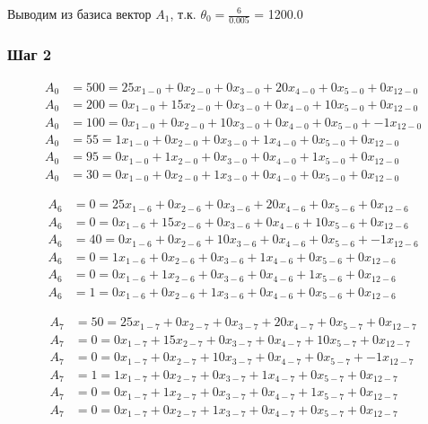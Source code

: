 Выводим из базиса вектор $A_1$, т.к. $\theta_0 = \frac{6}{0.005}$ = 1200.0

\subsubsection{Шаг 2}

\small

\vspace{-\baselineskip}\begin{align*}
	A_{0} &= 500 = 25x_{1-0} + 0x_{2-0} + 0x_{3-0} + 20x_{4-0} + 0x_{5-0} + 0x_{12-0} \\ 
	A_{0} &= 200 = 0x_{1-0} + 15x_{2-0} + 0x_{3-0} + 0x_{4-0} + 10x_{5-0} + 0x_{12-0} \\ 
	A_{0} &= 100 = 0x_{1-0} + 0x_{2-0} + 10x_{3-0} + 0x_{4-0} + 0x_{5-0} + -1x_{12-0} \\ 
	A_{0} &= 55 = 1x_{1-0} + 0x_{2-0} + 0x_{3-0} + 1x_{4-0} + 0x_{5-0} + 0x_{12-0} \\ 
	A_{0} &= 95 = 0x_{1-0} + 1x_{2-0} + 0x_{3-0} + 0x_{4-0} + 1x_{5-0} + 0x_{12-0} \\ 
	A_{0} &= 30 = 0x_{1-0} + 0x_{2-0} + 1x_{3-0} + 0x_{4-0} + 0x_{5-0} + 0x_{12-0}
\end{align*}

\vspace{-\baselineskip}\begin{align*}
	A_{6} &= 0 = 25x_{1-6} + 0x_{2-6} + 0x_{3-6} + 20x_{4-6} + 0x_{5-6} + 0x_{12-6} \\ 
	A_{6} &= 0 = 0x_{1-6} + 15x_{2-6} + 0x_{3-6} + 0x_{4-6} + 10x_{5-6} + 0x_{12-6} \\ 
	A_{6} &= 40 = 0x_{1-6} + 0x_{2-6} + 10x_{3-6} + 0x_{4-6} + 0x_{5-6} + -1x_{12-6} \\ 
	A_{6} &= 0 = 1x_{1-6} + 0x_{2-6} + 0x_{3-6} + 1x_{4-6} + 0x_{5-6} + 0x_{12-6} \\ 
	A_{6} &= 0 = 0x_{1-6} + 1x_{2-6} + 0x_{3-6} + 0x_{4-6} + 1x_{5-6} + 0x_{12-6} \\ 
	A_{6} &= 1 = 0x_{1-6} + 0x_{2-6} + 1x_{3-6} + 0x_{4-6} + 0x_{5-6} + 0x_{12-6}
\end{align*}

\vspace{-\baselineskip}\begin{align*}
	A_{7} &= 50 = 25x_{1-7} + 0x_{2-7} + 0x_{3-7} + 20x_{4-7} + 0x_{5-7} + 0x_{12-7} \\ 
	A_{7} &= 0 = 0x_{1-7} + 15x_{2-7} + 0x_{3-7} + 0x_{4-7} + 10x_{5-7} + 0x_{12-7} \\ 
	A_{7} &= 0 = 0x_{1-7} + 0x_{2-7} + 10x_{3-7} + 0x_{4-7} + 0x_{5-7} + -1x_{12-7} \\ 
	A_{7} &= 1 = 1x_{1-7} + 0x_{2-7} + 0x_{3-7} + 1x_{4-7} + 0x_{5-7} + 0x_{12-7} \\ 
	A_{7} &= 0 = 0x_{1-7} + 1x_{2-7} + 0x_{3-7} + 0x_{4-7} + 1x_{5-7} + 0x_{12-7} \\ 
	A_{7} &= 0 = 0x_{1-7} + 0x_{2-7} + 1x_{3-7} + 0x_{4-7} + 0x_{5-7} + 0x_{12-7}
\end{align*}

